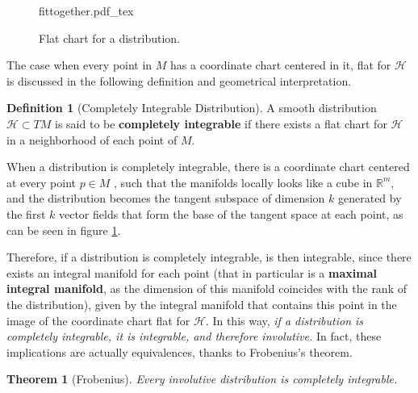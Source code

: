 \documentclass[12pt, letterpaper, reqno]{amsart}
\newcommand{\incfig}[2][1]{%
    \def\svgwidth{#1\columnwidth}
    {#2.pdf_tex}
}
\theoremstyle{definition}
\newtheorem{df}{Definition}
\theoremstyle{plain}
\newtheorem{thm}{Theorem}
\theoremstyle{remark}
\begin{document}
\begin{figure}
    \centering
    \incfig{fittogether}
    \caption{Flat chart for a distribution.}
    \label{fig:fittogether}
\end{figure}

The case when every point in $ M $ has a coordinate chart centered in it, flat for $ \mathcal{H} $ is discussed in the following definition and geometrical interpretation.

\begin{df}[Completely Integrable Distribution]
	A smooth distribution $ \mathcal{H}\subset TM $  is said to be \textbf{completely integrable} if there exists a flat chart for $ \mathcal{H} $ in a neighborhood of each point of $ M. $ 
\end{df}

When a distribution is completely integrable, there is a coordinate chart centered at every point $ p\in M $ , such that the manifolds locally looks like a cube in $ \mathbb{R}^m  $, and the distribution becomes the tangent subspace of dimension $ k $ generated by the first $ k $ vector fields that form the base of the tangent space at each point, as can be seen in figure \ref{fig:fittogether}. 

Therefore, if a distribution is completely integrable, is then integrable, since there exists an integral manifold for each point (that in particular is a \textbf{maximal integral manifold}, as the dimension of this manifold coincides with the rank of the distribution), given by the integral manifold that contains this point in the image of the coordinate chart flat for $ \mathcal{H}. $ In this way, \textit{ if a distribution is completely integrable, it is integrable, and therefore involutive.} In fact, these implications are actually equivalences, thanks to Frobenius's theorem.

\begin{thm}[Frobenius]
	Every involutive distribution is completely integrable.	
\end{thm}
\end{document}
